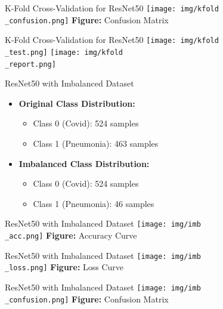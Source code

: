 \documentclass{beamer}
\begin{document}
\begin{frame}{K-Fold Cross-Validation for ResNet50}
	\centering
     	\texttt{[image: img/kfold\\\_confusion.png]}
    	\newline
    	\textbf{Figure:} Confusion Matrix
\end{frame}

\begin{frame}{K-Fold Cross-Validation for ResNet50}
	\centering
     	\texttt{[image: img/kfold\\\_test.png]}
	\texttt{[image: img/kfold\\\_report.png]}
\end{frame}

\begin{frame}{ResNet50 with Imbalanced Dataset}
\begin{itemize}
        \item \textbf{Original Class Distribution:} 
        \begin{itemize}
            \item Class 0 (Covid): 524 samples
            \item Class 1 (Pneumonia): 463 samples
        \end{itemize}
        \item \textbf{Imbalanced Class Distribution:} 
        \begin{itemize}
            \item Class 0 (Covid): 524 samples
            \item Class 1 (Pneumonia): 46 samples
        \end{itemize}
    \end{itemize}
\end{frame}

\begin{frame}{ResNet50 with Imbalanced Dataset}
	\centering
     	\texttt{[image: img/imb\\\_acc.png]}
    	\newline
    	\textbf{Figure:} Accuracy Curve
\end{frame}

\begin{frame}{ResNet50 with Imbalanced Dataset}
	\centering
     	\texttt{[image: img/imb\\\_loss.png]}
    	\newline
    	\textbf{Figure:} Loss Curve
\end{frame}

\begin{frame}{ResNet50 with Imbalanced Dataset}
	\centering
     	\texttt{[image: img/imb\\\_confusion.png]}
    	\newline
    	\textbf{Figure:} Confusion Matrix
\end{frame}
\end{document}
